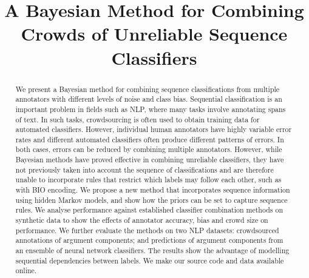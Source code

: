 \documentclass[conference]{IEEEtran}
\title{ 
A Bayesian Method for Combining Crowds of Unreliable Sequence Classifiers
}
\author{\IEEEauthorblockN{Anonymous}
\IEEEauthorblockA{Anonymous, \\
Anonymous \\
Email: anonymous}
\and
\IEEEauthorblockN{Anonymous}
\IEEEauthorblockA{Anonymous, \\
Anonymous \\
Email: anonymous}
\and
\IEEEauthorblockN{Anonymous}
\IEEEauthorblockA{Anonymous, \\
Anonymous \\
Email: anonymous}
}
\begin{document}
\maketitle

\begin{abstract}
We present a Bayesian method for combining sequence classifications from multiple annotators with different levels of noise and class bias. Sequential classification is an important problem in fields such as NLP, where many tasks involve annotating spans of text. 
In such tasks, crowdsourcing is often used to obtain training data for automated classifiers. However, individual human annotators have highly variable error rates and different automated classifiers often produce different patterns of errors. In both cases, errors can be reduced by combining multiple annotators.
However, while Bayesian methods have proved effective in combining unreliable classifiers, they have not previously taken into account the sequence of classifications and are therefore unable to incorporate rules that restrict which labels may follow each other, such as with BIO encoding. We propose a new method that incorporates sequence information using hidden Markov models, and show how the priors can be set to capture sequence rules. We analyse performance against established classifier combination methods on synthetic data to show the effects of annotator accuracy, bias and crowd size on performance. We further evaluate the methods on two NLP datasets: crowdsourced annotations of argument components; and predictions of argument components from an ensemble of neural network classifiers. The results show the advantage of modelling sequential dependencies between labels. We make our source code and data available online.
\end{abstract}

%
\IEEEpeerreviewmaketitle









%


\end{document}
